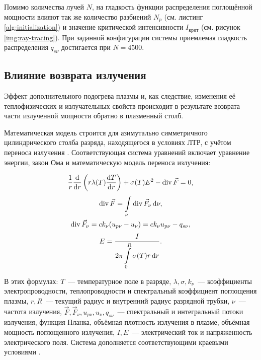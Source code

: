 Помимо количества лучей $N$, на гладкость функции распределения поглощённой мощности влияют так же количество разбиений $N_p$ (см. листинг \ref{alg:initialization}) и значение критической интенсивности $I_{\text{крит}}$ (см. рисунок \ref{img:ray-tracing}).
При заданной конфигурации системы приемлемая гладкость распределения $q_{s\nu}$ достигается при $N = 4500$.

\pagebreak

\begin{FixLineStretch}
\section{Влияние возврата излучения}
\end{FixLineStretch}

Эффект дополнительного подогрева плазмы и, как следствие, изменения её теплофизических и излучательных свойств происходит в результате возврата части излученной мощности обратно в плазменный столб.

Математическая модель строится для азимутально симметричного цилиндрического столба разряда, находящегося в условиях ЛТР, с учётом переноса излучения \cite{kerimov-2}.
Соответствующая система уравнений включает уравнение энергии, закон Ома и математическую модель переноса излучения:

\begin{equation}
	\label{eqn:article-1}
	\frac1r\frac{\mathrm d}{\mathrm dr} \left( r \lambda(T) \frac{\mathrm dT}{\mathrm dr} \right) + \sigma(T)E^2 - \operatorname{div}{\vec F = 0},
\end{equation}
\begin{equation}
	\label{eqn:article-2}
	\begin{gathered}
		\operatorname{div}{\vec F} = \int\displaylimits_\nu \operatorname{div}{\vec F_\nu} \,\mathrm d\nu, \\
		\operatorname{div}{\vec F_\nu} = ck_{\nu}(u_{p\nu} - u_{\nu}) = ck_{\nu}u_{p\nu} - q_{s\nu}, \\
	\end{gathered}
\end{equation}
\begin{equation}
	\label{eqn:article-3}
	E = \frac{I}{\displaystyle 2\pi\int\displaylimits_0^R \sigma(T) r\,\mathrm dr}.
\end{equation}

В этих формулах: $T$~— температурное поле в разряде, $\lambda, \sigma, k_\nu$~— коэффициенты электропроводности, теплопроводности и спектральный коэффициент поглощения плазмы, $r, R$~— текущий радиус и внутренний радиус разрядной трубки, $\nu$~— частота излучения, $\vec F, \vec F_\nu, u_{p\nu}, u_{\nu}, q_{s\nu}$~— спектральный и интегральный потоки излучения, функция Планка, объёмная плотность излучения в плазме, объёмная мощность поглощенного излучения, $I, E$~— электрический ток и напряженность электрического поля.
Система дополняется соответствующими краевыми условиями \cite{gradov-dissertation}.


